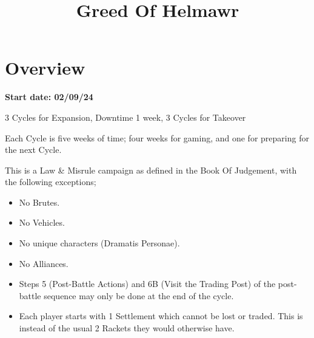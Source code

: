 \documentclass[a4paper]{article}
\title{Greed Of Helmawr}
\author{}
\date{}
\begin{document}
	\maketitle
	\section{Overview}
	\textbf{Start date: 02/09/24}

	3 Cycles for Expansion, Downtime 1 week, 3 Cycles for Takeover

	Each Cycle is five weeks of time; four weeks for gaming, and one for preparing for the next Cycle.

	This is a Law \& Misrule campaign as defined in the Book Of Judgement, with the following exceptions;
	\begin{itemize}
	 \item No Brutes.
	 \item No Vehicles.
	 \item No unique characters (Dramatis Personae).
	 \item No Alliances.
	 \item Steps 5 (Post-Battle Actions) and 6B (Visit the Trading Post) of the post-battle sequence may only be done at the end of the cycle.
	 \item Each player starts with 1 Settlement which cannot be lost or traded. This is instead of the usual 2 Rackets they would otherwise have.
	\end{itemize}
\end{document}
